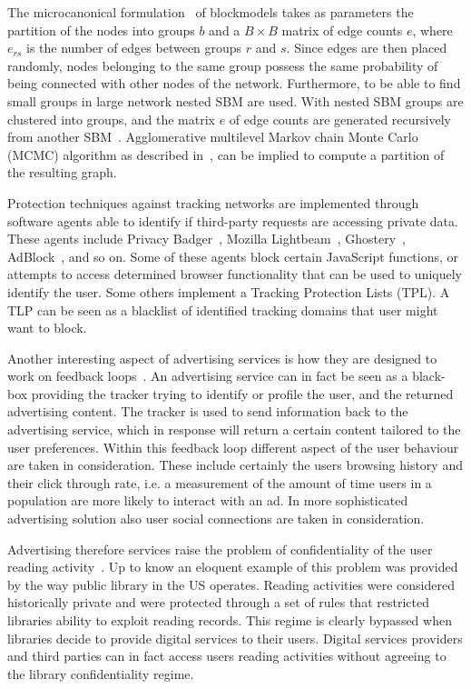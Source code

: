 The microcanonical formulation~\cite{peixoto2012entropy} of blockmodels takes as parameters the partition of the nodes into groups $b$ and a $B \times B$ matrix of edge counts $e$, where $e_{rs}$ is the number of edges between groups $r$ and $s$. Since edges are then placed randomly, nodes belonging to the same group possess the same probability of being connected with other nodes of the network. Furthermore, to be able to find small groups in large network nested SBM are used. With nested SBM groups are clustered into groups, and the matrix $e$ of edge counts are generated recursively from another SBM~\cite{peixoto2014hierarchical}. Agglomerative multilevel Markov chain Monte Carlo (MCMC) algorithm as described in~\cite{peixoto2014efficient}, can be implied to compute a partition of the resulting graph.

Protection techniques against tracking networks are implemented through software agents able to identify if third-party requests are accessing private data. These agents include Privacy Badger~\cite{privacy-badger}, Mozilla Lightbeam~\cite{lightbeam}, Ghostery~\cite{ghostery}, AdBlock~\cite{adblock}, and so on. Some of these agents block certain JavaScript functions, or attempts to access determined browser functionality that can be used to uniquely identify the user. Some others implement a Tracking Protection Lists (TPL). A TLP can be seen as a blacklist of identified tracking domains that user might want to block. 

Another interesting aspect of advertising services is how they are designed to work on feedback loops~\cite{degeling2016your}. An advertising service can in fact be seen as a black-box providing the tracker trying to identify or profile the user, and the returned advertising content. The tracker is used to send information back to the advertising service, which in response will return a certain content tailored to the user preferences. Within this feedback loop different aspect of the user behaviour are taken in consideration. These include certainly the users browsing history and their click through rate, i.e. a measurement of the amount of time users in a population are more likely to interact with an ad. In more sophisticated advertising solution also user social connections are taken in consideration.

Advertising therefore services raise the problem of confidentiality of the user reading activity~\cite{ard2013confidentiality}. Up to know an eloquent example of this problem was provided by the way public library in the US operates. Reading activities were considered historically private and were protected through a set of rules that restricted libraries ability to exploit reading records. This regime is clearly bypassed when libraries decide to provide digital services to their users. Digital services providers and third parties can in fact access users reading activities without agreeing to the library confidentiality regime.

